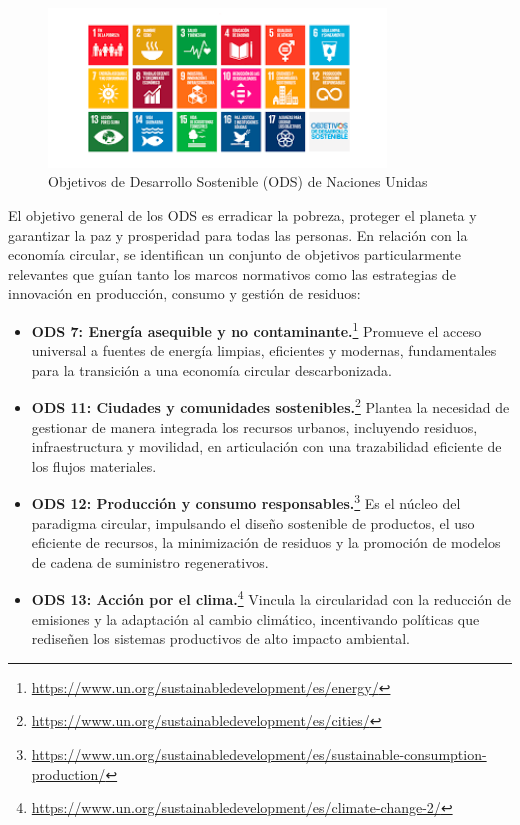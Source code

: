 \begin{figure}[!htpb]
    \centering
    \includegraphics[width=0.8\textwidth]{Figures/ods.png}
    \caption{Objetivos de Desarrollo Sostenible (ODS) de Naciones Unidas}
    \label{fig:ods}
\end{figure}

El objetivo general de los ODS es erradicar la pobreza, proteger el planeta y garantizar la paz y prosperidad para todas las personas. En relación con la economía circular, se identifican un conjunto de objetivos particularmente relevantes que guían tanto los marcos normativos como las estrategias de innovación en producción, consumo y gestión de residuos:

\begin{itemize}
\item \textbf{ODS 7: Energía asequible y no contaminante.}\footnote{\url{https://www.un.org/sustainabledevelopment/es/energy/}} Promueve el acceso universal a fuentes de energía limpias, eficientes y modernas, fundamentales para la transición a una economía circular descarbonizada.
\item \textbf{ODS 11: Ciudades y comunidades sostenibles.}\footnote{\url{https://www.un.org/sustainabledevelopment/es/cities/}} Plantea la necesidad de gestionar de manera integrada los recursos urbanos, incluyendo residuos, infraestructura y movilidad, en articulación con una trazabilidad eficiente de los flujos materiales.
\item \textbf{ODS 12: Producción y consumo responsables.}\footnote{\url{https://www.un.org/sustainabledevelopment/es/sustainable-consumption-production/}} Es el núcleo del paradigma circular, impulsando el diseño sostenible de productos, el uso eficiente de recursos, la minimización de residuos y la promoción de modelos de cadena de suministro regenerativos.
\item \textbf{ODS 13: Acción por el clima.}\footnote{\url{https://www.un.org/sustainabledevelopment/es/climate-change-2/}} Vincula la circularidad con la reducción de emisiones y la adaptación al cambio climático, incentivando políticas que rediseñen los sistemas productivos de alto impacto ambiental.
\end{itemize}

